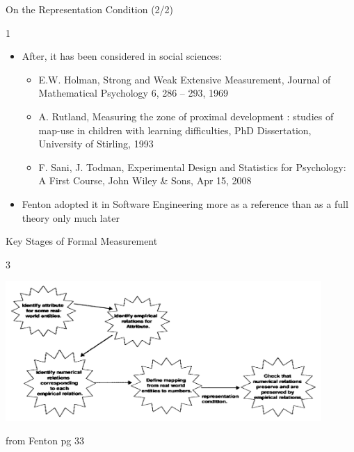\documentclass{beamer}
\begin{document}
\begin{frame}{\centerline{ On the Representation Condition (2/2)}}
1

\begin{itemize}
\item After, it has been considered in social sciences: 
\begin{itemize}
\item E.W. Holman, Strong and Weak Extensive Measurement, Journal of Mathematical Psychology 6, 286 -- 293, 1969
\item A. Rutland, Measuring the zone of proximal development : studies of map-use in children with learning difficulties, PhD Dissertation, University of Stirling, 1993
\item F. Sani, J. Todman, Experimental Design and Statistics for Psychology: A First Course, John Wiley \& Sons, Apr 15, 2008 
\end{itemize}
\item Fenton adopted it in Software Engineering more as a reference than as a full theory only much later
\end{itemize}


\end{frame}



\begin{frame}{\centerline{Key Stages of Formal Measurement}}
3
\begin{center}
\includegraphics[width=120mm]{A2022.IDSEPC.SperimentazioneDeduzione/img-img13.png}
\newline
\end{center}

\begin{small}
\begin{center}
from Fenton pg 33
\end{center}
\end{small}
\end{frame}
\end{document}
